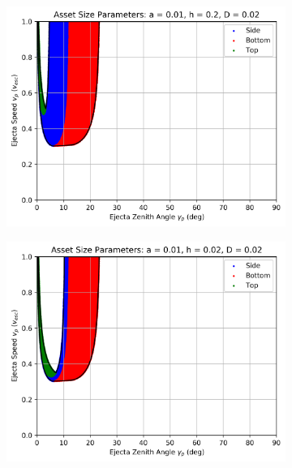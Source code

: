 \documentclass{article}
\begin{document}
\begin{figure}
	\begin{subfigure}[t]{.32\textwidth}
		\centering
		\includegraphics[width=.98\linewidth]{asset_speed_zenith_plot_1.100e+00_1.000e-02_2.000e-01_2.000e-02.png}  
		\label{fig:sub-asset_speed_zenith_h2_4}
	\end{subfigure}
	\begin{subfigure}[t]{.32\textwidth}
		\centering
		\includegraphics[width=.98\linewidth]{asset_speed_zenith_plot_1.100e+00_1.000e-02_2.000e-02_2.000e-02.png}  
		\label{fig:sub-asset_speed_zenith_h2_5}
	\end{subfigure}

\end{figure}
\end{document}

